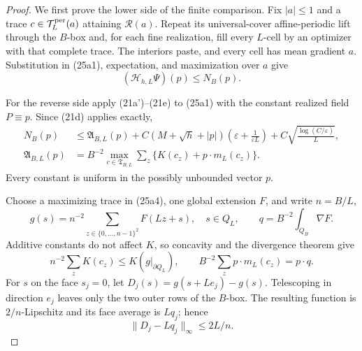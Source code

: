 \documentclass{smfart}
\theoremstyle{definition}
\newcommand{\1}{\mathbf 1}
\begin{document}
\begin{proof}
We first prove the lower side of the finite comparison.  Fix
$|a|\leq1$ and a trace $c\in\mathcal T_ L^{\rm per}(a)$ attaining
$\mathcal R(a)$.  Repeat its universal-cover affine-periodic lift through the $B$-box
and, for each fine realization, fill every $L$-cell by an optimizer
with that complete trace.  The interiors paste, and every cell has mean
gradient $a$.  Substitution in (25a1), expectation, and maximization
over $a$ give
\begin{equation}
(\mathcal H_ {h,L}\Psi)(p)\leq N_ B(p).
\tag{25a2}
\end{equation}

For the reverse side apply (21a')--(21e) to (25a1) with the constant
realized field $P\equiv p$.  Since (21d) applies exactly,
\begin{align}
N_ B(p)&\leq \mathfrak A_ {B,L}(p)
+C(M+\sqrt h+|p|)
\left(\varepsilon+\frac1{\varepsilon L}\right)
+C\sqrt{\frac{\log(C/\varepsilon)}L},                         \tag{25a3}\\
\mathfrak A_ {B,L}(p)&=B^{-2}\max_ {c\in\mathfrak T_ {B,L}}
\sum_ z\{K(c_ z)+p\cdot m_ L(c_ z)\}.                       \tag{25a4}
\end{align}
Every constant is uniform in the possibly unbounded vector $p$.

Choose a maximizing trace in (25a4), one global extension $F$, and
write $n=B/L$,
\begin{equation}
g(s)=n^{-2}\sum_ {z\in\{0,\ldots,n-1\}^2}F(Lz+s),\quad s\in Q_ L,
\qquad q=B^{-2}\int_ {Q_ B}\nabla F.
\tag{25a5}
\end{equation}
Additive constants do not affect $K$, so concavity and the divergence
theorem give
\begin{equation}
n^{-2}\sum_ zK(c_ z)\leq K(g|_ {\partial Q_ L}),\qquad
B^{-2}\sum_ zp\cdot m_ L(c_ z)=p\cdot q.
\tag{25a6}
\end{equation}
For $s$ on the face $s_ j=0$, let
$D_ j(s)=g(s+Le_ j)-g(s)$.  Telescoping in direction $e_ j$ leaves
only the two outer rows of the $B$-box.  The resulting function is
$2/n$-Lipschitz and its face average is $Lq_ j$; hence
\begin{equation}
\|D_ j-Lq_ j\|_ \infty\leq2L/n.
\tag{25a7}
\end{equation}


\end{proof}
\end{document}
